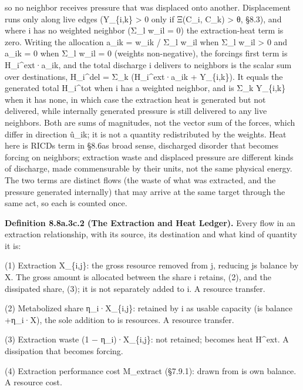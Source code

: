 \documentclass[
]{article}
\begin{document}
so no neighbor receives pressure that was displaced onto another.
Displacement runs only along live edges (Y\_\{i,k\} \textgreater{} 0
only if Ξ(C\_i, C\_k) \textgreater{} θ, §8.3), and where i has no
weighted neighbor (Σ\_l w\_il = 0) the extraction-heat term is zero.
Writing the allocation a\_ik = w\_ik / Σ\_l w\_il when Σ\_l w\_il
\textgreater{} 0 and a\_ik = 0 when Σ\_l w\_il = 0 (weights
non-negative), the forcing\textquotesingle s first term is
H\_i\^{}ext·a\_ik, and the total discharge i delivers to neighbors is
the scalar sum over destinations, H\_i\^{}del = Σ\_k (H\_i\^{}ext·a\_ik
+ Y\_\{i,k\}). It equals the generated total H\_i\^{}tot when i has a
weighted neighbor, and is Σ\_k Y\_\{i,k\} when it has none, in which
case the extraction heat is generated but not delivered, while
internally generated pressure is still delivered to any live neighbors.
Both are sums of magnitudes, not the vector sum of the forces, which
differ in direction û\_ik; it is not a quantity redistributed by the
weights. \textquotesingle Heat\textquotesingle{} here is
RICD\textquotesingle s term in §8.6a\textquotesingle s broad sense,
discharged disorder that becomes forcing on neighbors; extraction waste
and displaced pressure are different kinds of discharge, made
commensurable by their units, not the same physical energy. The two
terms are distinct flows (the waste of what was extracted, and the
pressure generated internally) that may arrive at the same target
through the same act, so each is counted once.

\textbf{Definition 8.8a.3c.2 (The Extraction and Heat Ledger).} Every
flow in an extraction relationship, with its source, its destination and
what kind of quantity it is:

(1) Extraction X\_\{i,j\}: the gross resource removed from j, reducing
j\textquotesingle s balance by X. The gross amount is allocated between
the share i retains, (2), and the dissipated share, (3); it is not
separately added to i. A resource transfer.

(2) Metabolized share η\_i·X\_\{i,j\}: retained by i as usable capacity
(i\textquotesingle s balance +η\_i·X), the sole addition to
i\textquotesingle s resources. A resource transfer.

(3) Extraction waste (1 − η\_i)·X\_\{i,j\}: not retained; becomes heat
H\^{}ext. A dissipation that becomes forcing.

(4) Extraction performance cost M\_extract (§7.9.1): drawn from
i\textquotesingle s own balance. A resource cost.
\end{document}
